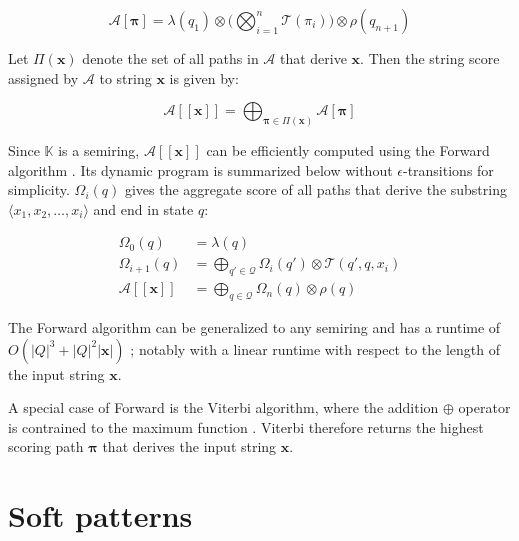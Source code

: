 \begin{equation}
  \mathcal{A}[\pmb{\pi}] = \lambda(q_1) \otimes \Bigg( \bigotimes_{i=1}^n \mathcal{T}(\pi_i) \Bigg) \otimes \rho(q_{n+1})
\end{equation}

\begin{definition}

Let $\Pi(\pmb{x})$ denote the set of all paths in $\mathcal{A}$ that derive $\pmb{x}$. Then the string score assigned by $\mathcal{A}$ to string $\pmb{x}$ is given by:
  
\end{definition}

\begin{equation}
  \mathcal{A}[\![\pmb{x}]\!] = \bigoplus_{\pmb{\pi} \in \Pi(\pmb{x})} \mathcal{A}[\pmb{\pi}]
\end{equation}

\begin{remark}
  Since $\mathbb{K}$ is a semiring, $\mathcal{A}[\![\pmb{x}]\!]$ can be efficiently computed using the Forward algorithm \citep{baum1966statistical}. Its dynamic program is summarized below without $\epsilon$-transitions for simplicity. $\Omega_i(q)$ gives the aggregate score of all paths that derive the substring $\langle x_1, x_2, \dots, x_i \rangle$ and end in state $q$:
 
\begin{subequations}
  \begin{align}
    \Omega_0(q) &= \lambda(q) \\
    \Omega_{i+1}(q) &= \bigoplus_{q' \in \mathcal{Q}} \Omega_i(q') \otimes \mathcal{T}(q',q,x_i)  \\
    \mathcal{A}[\![\pmb{x}]\!] &= \bigoplus_{q \in \mathcal{Q}} \Omega_n(q) \otimes \rho(q)
  \end{align}
\end{subequations}

\end{remark}

\begin{remark}
  The Forward algorithm can be generalized to any semiring \citep{eisner2002parameter} and has a runtime of $O(|Q|^3 + |Q|^2|\pmb{x}|)$ \citep{schwartz2018sopa}; notably with a linear runtime with respect to the length of the input string $\pmb{x}$.
\end{remark}

\begin{remark}
  A special case of Forward is the Viterbi algorithm, where the addition $\oplus$ operator is contrained to the maximum function \citep{viterbi1967error}. Viterbi therefore returns the highest scoring path $\pmb{\pi}$ that derives the input string $\pmb{x}$.
\end{remark}

\section{Soft patterns}
\label{sopa}

